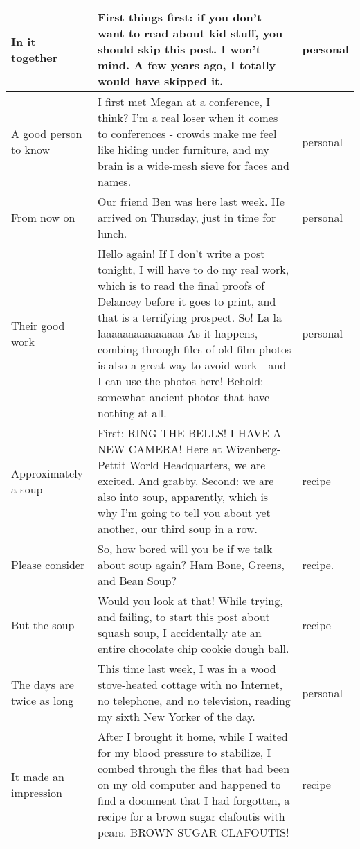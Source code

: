 \documentclass[12pt]{article}
\begin{document}
\begin{longtable}{ | p{3.0cm} | p{12.0cm} |p{2.0cm}| }
 In it together& First things first: if you don’t want to read about kid stuff, you should skip this post. I won’t mind.  A few years ago, I totally would have skipped it. &  personal \\\hline
 
A good person to know & I first met Megan at a conference, I think? I’m a real loser when it comes to conferences - crowds make me feel like hiding under furniture, and my brain is a wide-mesh sieve for faces and names.  & personal\\\hline

From now on & Our friend Ben was here last week. He arrived on Thursday, just in time for lunch.& personal \\\hline

Their good work & Hello again! If I don’t write a post tonight, I will have to do my real work, which is to read the final proofs of Delancey before it goes to print, and that is a terrifying prospect. So!  La la laaaaaaaaaaaaaaa As it happens, combing through files of old film photos is also a great way to avoid work - and I can use the photos here! Behold: somewhat ancient photos that have nothing at all. & personal \\\hline
Approximately a soup & First: RING THE BELLS! I HAVE A NEW CAMERA! Here at Wizenberg-Pettit World Headquarters, we are excited. And grabby. Second: we are also into soup, apparently, which is why I’m going to tell you about yet another, our third soup in a row. & recipe  \\\hline 

Please consider & So, how bored will you be if we talk about soup again? Ham Bone, Greens, and Bean Soup? &  recipe. \\\hline

But the soup & Would you look at that! While trying, and failing, to start this post about squash soup, I accidentally ate an entire chocolate chip cookie dough ball. & recipe \\\hline

The days are twice as long & This time last week, I was in a wood stove-heated cottage with no Internet, no telephone, and no television, reading my sixth New Yorker of the day. & personal  \\\hline

It made an impression & After I brought it home, while I waited for my blood pressure to stabilize, I combed through the files that had been on my old computer and happened to find a document that I had forgotten, a recipe for a brown sugar clafoutis with pears. BROWN SUGAR CLAFOUTIS! &  recipe \\\hline


\end{longtable}
\end{document}
